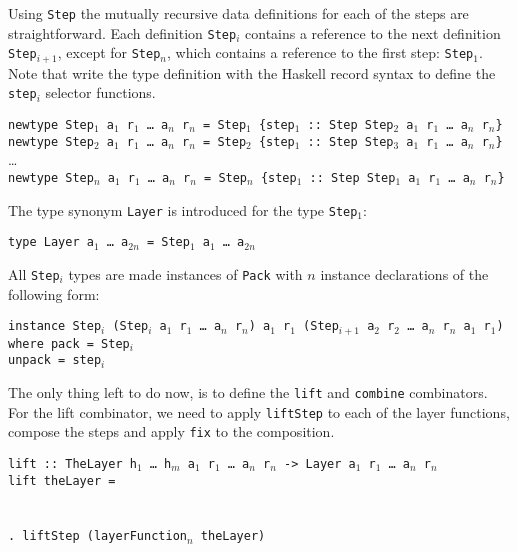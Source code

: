 \par Using \texttt{Step} the mutually recursive data definitions for each
        of the steps are straightforward. Each definition \texttt{Step$_i$} contains a
        reference to the next definition \texttt{Step$_{i+1}$}, except for
        \texttt{Step$_n$}, which contains a reference to the first step:
        \texttt{Step$_1$}. Note that write the type definition with the Haskell record
        syntax to define the \texttt{step$_i$} selector functions.\par
{\tt newtype Step$_1$ a$_1$ r$_1$ \dots~a$_n$ r$_n$ = Step$_1$ \{step$_1$}\verb| :: |{\tt Step Step$_2$ a$_1$ r$_1$ \dots~a$_n$ r$_n$\}}\\
{\tt newtype Step$_2$ a$_1$ r$_1$ \dots~a$_n$ r$_n$ = Step$_2$ \{step$_1$}\verb| :: |{\tt Step Step$_3$ a$_1$ r$_1$ \dots~a$_n$ r$_n$\}}\\
\dots \\
{\tt newtype Step$_n$ a$_1$ r$_1$ \dots~a$_n$ r$_n$ = Step$_n$ \{step$_1$}\verb| :: |{\tt Step Step$_1$ a$_1$ r$_1$ \dots~a$_n$ r$_n$\}}
\par The type synonym \texttt{Layer} is introduced for the type
        \texttt{Step$_1$}:\par
{\tt type Layer a$_1$ \dots~a$_{2n}$ = Step$_1$ a$_1$ \dots~a$_{2n}$}
\par All \texttt{Step$_i$} types are made instances of \texttt{Pack} with
        $n$ instance declarations of the following form:\begin{tabbing}
{\tt i}\={\tt nstance Step$_i$ (Step$_i$ a$_1$ r$_1$ \dots~a$_n$  r$_n$) a$_1$ r$_1$ (Step$_{i+1}$ a$_2$ r$_2$ \dots~a$_n$ r$_n$ a$_1$ r$_1$)}\\
\> {\tt where }\={\tt pack = Step$_i$}\\
\>\> {\tt unpack = step$_i$}
\end{tabbing}
\par The only thing left to do now, is to define the \texttt{lift} and
        \texttt{combine} combinators. For the lift combinator, we need to apply
        \texttt{liftStep} to each of the layer functions, compose the steps and apply
        \texttt{fix} to the composition. \begin{tabbing}
{\tt lift}\verb| :: |{\tt TheLayer h$_1$ \dots ~h$_m$ a$_1$ r$_1$ \dots ~a$_n$ r$_n$ -> Layer a$_1$ r$_1$ \dots ~a$_n$ r$_n$}\\
{\tt li}\={\tt ft t}\={\tt heLayer = }\\
\\
\>\>{\tt \dots}\\ 
\>\>\verb|. lift|{\tt Step (layerFunction$_n$ theLayer)}
\end{tabbing}
